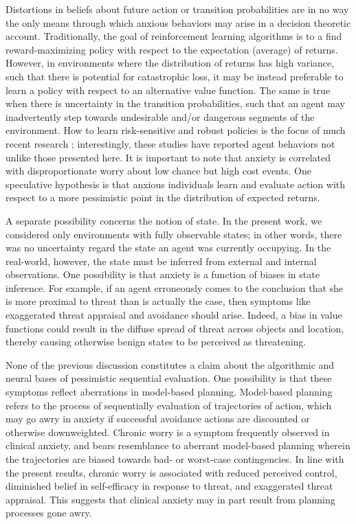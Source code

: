 \documentclass[11pt]{article} %
\begin{document}
Distortions in beliefs about future action or transition probabilities are in no way the only means through which anxious behaviors may arise in a decision theoretic account. Traditionally, the goal of reinforcement learning algorithms is to a find reward-maximizing policy with respect to the expectation (average) of returns. However, in environments where the distribution of returns has high variance, such that there is potential for catastrophic loss, it may be instead preferable to learn a policy with respect to an alternative value function. The same is true when there is uncertainty in the transition probabilities, such that an agent may inadvertently step towards undesirable and/or dangerous segments of the environment. How to learn risk-sensitive and robust policies is the focus of much recent research \cite{morimura2012, chow2015, bellemare2017}; interestingly, these studies have reported agent behaviors not unlike those presented here. It is important to note that anxiety is correlated with disproportionate worry about low chance but high cost events\cite{Miceli2005}. One speculative hypothesis is that anxious individuals learn and evaluate action with respect  to a more pessimistic point in the distribution of expected returns.

A separate possibility concerns the notion of state. In the present work, we considered only environments with fully observable states; in other words, there was no uncertainty regard the state an agent was currently occupying. In the real-world, however, the state must be inferred from external and internal observations. One possibility is that anxiety is a function of biases in state inference\cite{Paulus2012}. For example, if an agent erroneously comes to the conclusion that she is more proximal to threat than is actually the case, then symptoms like exaggerated threat appraisal and avoidance should arise. Indeed, a bias in value functions could result in the diffuse spread of threat across objects\citep{norbury2018} and location\citep{schulz2018}, thereby causing otherwise benign states to be perceived as threatening. 


None of the previous discussion constitutes a claim about the algorithmic and neural bases of pessimistic sequential evaluation. One possibility is that these symptoms reflect aberrations in model-based planning. Model-based planning refers to the process of sequentially evaluation of trajectories of action, which may go awry in anxiety if successful avoidance actions are discounted or otherwise downweighted. Chronic worry is a symptom frequently observed in clinical anxiety, and bears resemblance to aberrant model-based planning wherein the trajectories are biased towards bad- or worst-case contingencies. In line with the present results, chronic worry is associated with reduced perceived control, diminished belief in self-efficacy in response to threat, and exaggerated threat appraisal\cite{Berenbaum2010}. This suggests that clinical anxiety may in part result from planning processes gone awry. 
\end{document}
